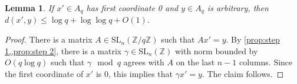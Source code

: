 \documentclass[12pt, a4paper]{amsart}
\numberwithin{equation}{section}
\newtheorem{lemma}[theorem]{Lemma}
\theoremstyle{definition}
\newcommand{\Z}{\mathbb{Z}}
\newcommand{\SL}{\mathrm{SL}}
\begin{document}
\begin{lemma}
If $x'\in A_q$ has first coordinate 0 and $y \in A_q$ is arbitrary, then $d(x',y)\le \log q+\log \log q+O(1)$.
\end{lemma}
\begin{proof}
    There is a matrix $A \in \SL_n(\Z/q\Z)$ such that $Ax' = y$. By \cref{prop:step 1,,prop:step 2}, there is a matrix $\gamma \in \SL_n(\Z)$ with norm bounded by $O(q\log q)$ such that $\gamma \mod q$ agrees with $A$ on the last $n-1$ columns. Since the first coordinate of $x'$ is $0$, this implies that $\gamma x'=y$. The claim follows.
\end{proof}



\end{document}

